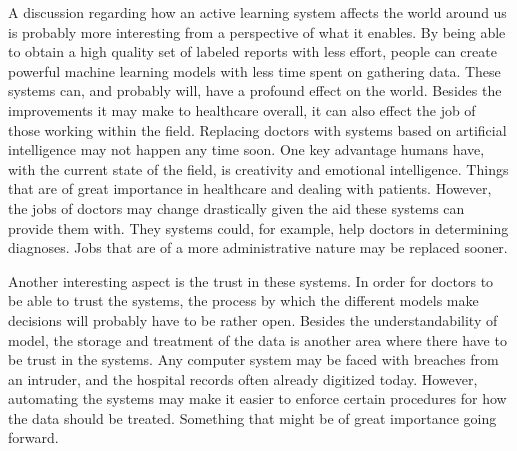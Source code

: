 A discussion regarding how an active learning system affects the world around us is probably more interesting from a perspective of what it enables.
By being able to obtain a high quality set of labeled reports with less effort, people can create powerful machine learning models with less time spent on gathering data.
These systems can, and probably will, have a profound effect on the world.
Besides the improvements it may make to healthcare overall, it can also effect the job of those working within the field.
Replacing doctors with systems based on artificial intelligence may not happen any time soon.
One key advantage humans have, with the current state of the field, is creativity and emotional intelligence.
Things that are of great importance in healthcare and dealing with patients.
However, the jobs of doctors may change drastically given the aid these systems can provide them with.
They systems could, for example, help doctors in determining diagnoses.
Jobs that are of a more administrative nature may be replaced sooner.

Another interesting aspect is the trust in these systems.
In order for doctors to be able to trust the systems, the process by which the different models make decisions will probably have to be rather open.
Besides the understandability of model, the storage and treatment of the data is another area where there have to be trust in the systems.
Any computer system may be faced with breaches from an intruder, and the hospital records often already digitized today.
However, automating the systems may make it easier to enforce certain procedures for how the data should be treated.
Something that might be of great importance going forward.